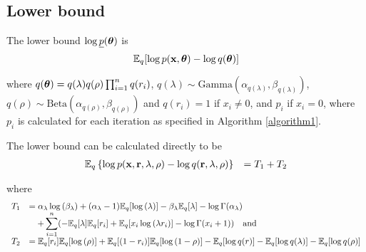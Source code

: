 \documentclass{article}[12pt]
\begin{document}
\subsection{Lower bound}
The lower bound $\log{\underline{p}({\boldsymbol\theta})}$ is
$$
	{\mathbb E}_q[\log{p({\bf x}, {\boldsymbol\theta})} - \log{q({\boldsymbol\theta})}]
$$

\noindent where $q({\boldsymbol \theta}) = q(\lambda) q(\rho) \prod_{i=1}^n q(r_i)$,
$q(\lambda) \sim \text{Gamma}{(\alpha_{q(\lambda)}, \beta_{q(\lambda)})}$,
$q(\rho) \sim \text{Beta}(\alpha_{q(\rho)}, \beta_{q(\rho)})$ and
$q(r_i) = 1$ if $x_i \ne 0$, and $p_i$ if $x_i = 0$, where $p_i$ is
calculated for each iteration as specified in Algorithm \ref{algorithm1}.

The lower bound can be calculated directly to be
$$
\begin{array}{rl}
{\mathbb E}_q \left\{ \log{p({\bf x}, {\bf r}, \lambda, \rho)} - \log{q({\bf r}, \lambda, \rho)} \right\} &= T_1 + T_2 \\
\end{array}
$$

\noindent where
$$
\begin{array}{rl}
T_1 & \displaystyle =
\alpha_\lambda \log{(\beta_\lambda)} + (\alpha_\lambda - 1) {\mathbb E}_q[\log{(\lambda)}] - \beta_\lambda {\mathbb E}_q [\lambda] - \log\Gamma(\alpha_\lambda) \\
& \displaystyle \quad + \sum_{i=1}^n ( -{\mathbb E}_q [\lambda] {\mathbb E}_q [r_i] + {\mathbb E}_q[x_i \log{(\lambda r_i)}] - \log\Gamma(x_i+1)) \quad \mbox{and}
\\ [1ex]
T_2 &={\mathbb E}_q[r_i] {\mathbb E}_q[\log{(\rho)}] + {\mathbb E}_q[(1 - r_i)] {\mathbb E}_q[\log{(1 - \rho)}] 
- {\mathbb E}_q[\log{q(r)}] 
- {\mathbb E}_q[\log{q(\lambda)}] 
- {\mathbb E}_q[ \log{q(\rho)}]
\end{array}
$$
\end{document}
